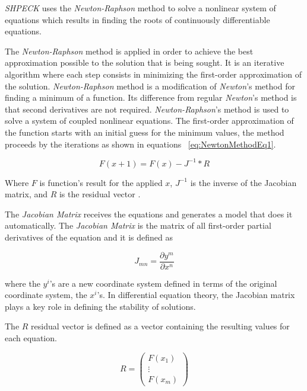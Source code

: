 \emph{SHPECK} uses the \emph{Newton-Raphson} method to solve a nonlinear system of equations which results in finding the roots of continuously differentiable equations. 

The \emph{Newton-Raphson} method is applied in order to achieve the best approximation possible to the solution that is being sought. It is an iterative algorithm where each step consists in minimizing the first-order approximation of the solution. \emph{Newton-Raphson} method is a modification of \emph{Newton}'s method for finding a minimum of a function. Its difference from regular \emph{Newton}'s method is that second derivatives are not required. \emph{Newton-Raphson}'s method is used to solve a system of coupled nonlinear equations. The first-order approximation of the function starts with an initial guess for the minimum values, the method proceeds by the iterations as shown in equations ~\ref{eq:NewtonMethodEq1}.

\begin{equation}
\label{eq:NewtonMethodEq1}
F(x+1) = F(x) - J^{-1} * R
\end{equation}

Where $F$ is function's result for the applied $x$, $J^{-1}$ is the inverse of the Jacobian matrix, and $R$ is the residual vector \cite{Isaacson:66}.

The \emph{Jacobian Matrix} receives the equations and generates a model that does it automatically. The \emph{Jacobian Matrix} is the matrix of all first-order partial derivatives of the equation and it is defined as

\begin{equation}
\label{eq:JacobianDefinition}
J_{mn} = \frac{\partial y^m}{\partial x^n}
\end{equation}

where the $y^i$'s are a new coordinate system defined in terms of the original coordinate system, the $x^i$'s. In differential equation theory, the Jacobian matrix plays a key role in defining the stability of solutions.

The $R$ residual vector is defined as a vector containing the resulting values for each equation.

\begin{equation}
\label{eq:residualVector}
R = \begin{pmatrix}
 F(x_1) \\
 \vdots \\
 F(x_m)
 \end{pmatrix}
\end{equation}

